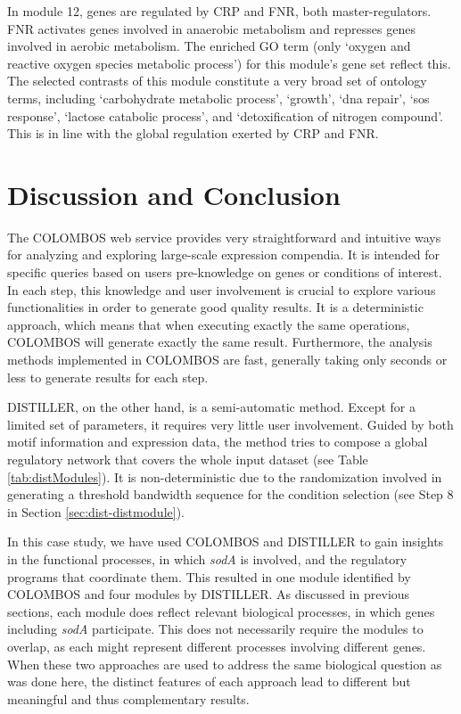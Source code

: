 In module 12, genes are regulated by CRP and FNR, both master-regulators. 
%
FNR activates genes involved in anaerobic metabolism and represses genes
involved in aerobic metabolism.  The enriched GO term (only `oxygen and
reactive oxygen species metabolic process') for this module's gene set reflect
this.
%
The selected contrasts of this module constitute a very broad set of ontology
terms, including `carbohydrate metabolic process', `growth', `dna repair', `sos
response', `lactose catabolic process', and `detoxification of nitrogen
compound'.  This is in line with the global regulation exerted by CRP and FNR.



\section{Discussion and Conclusion}

The COLOMBOS web service provides very straightforward and intuitive
ways for analyzing and exploring large-scale expression compendia. It is
intended for specific queries based on users pre-knowledge on genes or
conditions of interest. In each step, this knowledge and user
involvement is crucial to explore various functionalities in order to
generate good quality results. 
%
It is a deterministic approach, which means that when executing exactly the
same operations, COLOMBOS will generate exactly the same result. Furthermore,
the analysis methods implemented in COLOMBOS are fast, generally taking only
seconds or less to generate results for each step.

DISTILLER, on the other hand, is a semi-automatic method. Except for a limited
set of parameters, it requires very little user involvement. Guided by both
motif information and expression data, the method tries to compose a global
regulatory network that covers the whole input dataset (see Table
\ref{tab:distModules}).
%
It is non-deterministic due to the randomization involved in generating a
threshold bandwidth sequence for the condition selection (see Step 8 in Section
\ref{sec:dist-distmodule}).

In this case study, we have used COLOMBOS and DISTILLER to gain insights in the
functional processes, in which \textit{sodA} is involved, and the regulatory
programs that coordinate them. This resulted in one module identified by
COLOMBOS and four modules by DISTILLER.  As discussed in previous
sections, each module does reflect relevant biological processes, in which
genes including \textit{sodA} participate.  This does not necessarily require
the modules to overlap, as each might represent different processes involving
different genes.  When these two approaches are used to address the same
biological question as was done here, the distinct features of each approach
lead to different but meaningful and thus complementary results.


